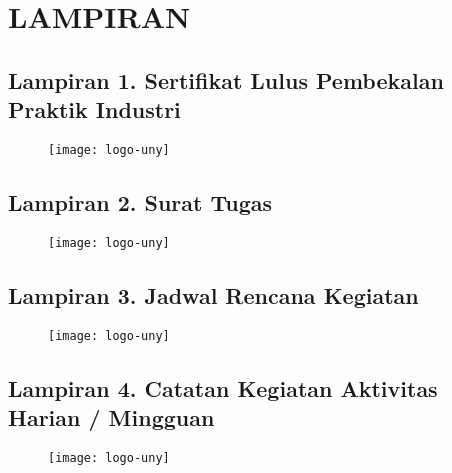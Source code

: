 
\appendix
\chapter*{LAMPIRAN}


\section*{Lampiran 1. Sertifikat Lulus Pembekalan Praktik Industri}
\begin{figure}[H]
	\centering
	\texttt{[image: logo-uny]}
\end{figure}

\newpage

\section*{Lampiran 2. Surat Tugas \tipe}
\begin{figure}[H]
	\centering
	\texttt{[image: logo-uny]}
\end{figure}

\newpage

\section*{Lampiran 3. Jadwal Rencana Kegiatan \tipe}
\begin{figure}[H]
	\centering
	\texttt{[image: logo-uny]}
\end{figure}

\newpage

\section*{Lampiran 4. Catatan Kegiatan Aktivitas Harian / Mingguan}
\begin{figure}[H]
	\centering
	\texttt{[image: logo-uny]}
\end{figure}

